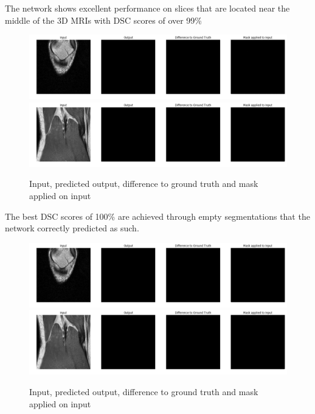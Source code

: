 The network shows excellent performance on slices that are located near the middle of the 3D MRIs with DSC scores of over 99\%

\begin{figure}[H]
\centering
\par
\includegraphics[width=1.0\textwidth]{imgs/sample5.png}
\includegraphics[width=1.0\textwidth]{imgs/sample6.png}
\caption{Input, predicted output, difference to ground truth and mask applied on input}
\par
\end{figure}

The best DSC scores of 100\% are achieved through empty segmentations that the network correctly predicted as such.

\begin{figure}[H]
\centering
\par
\includegraphics[width=1.0\textwidth]{imgs/sample5.png}
\includegraphics[width=1.0\textwidth]{imgs/sample6.png}
\caption{Input, predicted output, difference to ground truth and mask applied on input}
\par
\end{figure}

